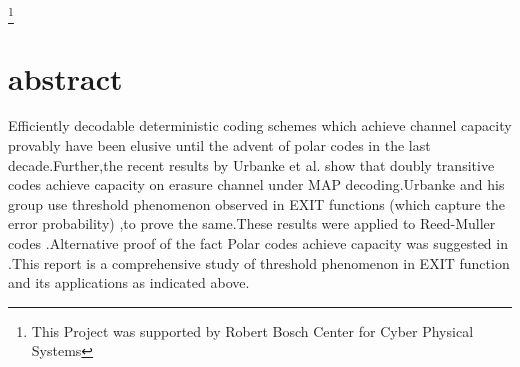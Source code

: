 \documentclass[
11pt, %
a4paper, %
oneside, %
headinclude,footinclude, %
BCOR5mm, %
]{scrartcl}
\begin{document}
\pagestyle{scrheadings} %


\newpage
\maketitle %


\setcounter{tocdepth}{2} %

\tableofcontents %
\footnote{This Project was supported by Robert Bosch Center for Cyber Physical Systems}
\newpage
\section*{abstract}
Efficiently decodable deterministic coding schemes which achieve channel capacity provably have been elusive until the advent of polar codes\cite{arikan} in the last decade.Further,the recent results by Urbanke et al.\cite{rm1} show that doubly transitive codes achieve capacity on erasure channel under MAP decoding.Urbanke and his group use threshold phenomenon observed in EXIT functions (which capture the error probability) ,to prove the same.These results were applied to Reed-Muller codes \cite{rm1}.Alternative proof of the fact Polar codes achieve capacity was suggested in \cite{vishva}.This report is a comprehensive study of threshold phenomenon in EXIT function and its applications as indicated above.

\newpage
\end{document}
